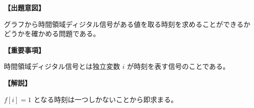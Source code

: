 \noindent \textbf{【出題意図】}

\noindent グラフから時間領域ディジタル信号がある値を取る時刻を求めることができるかどうかを確かめる問題である。

\vspace{1em}
\noindent \textbf{【重要事項】}

\bigskip
\noindent 時間領域ディジタル信号とは独立変数 $i$ が時刻を表す信号のことである。

\vspace{1em}
\noindent \textbf{【解説】}

\noindent $f[i]=1$ となる時刻は一つしかないことから即求まる。

